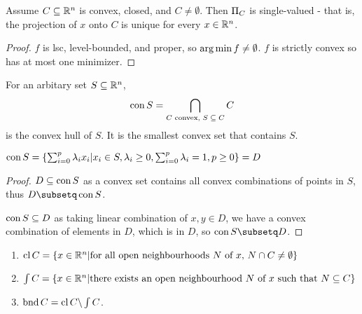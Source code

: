 \begin{thm}
  \label{sec:convexity-13}
  Assume $C \subseteq \mathbb{R}^{n}$ is convex, closed, and $C \neq
  \emptyset$.  Then $\operatorname*{\Pi}_{C}$ is single-valued - that is, the
  projection of $x$ onto $C$ is unique for every $x \in \mathbb{R}^{n}$.
\end{thm}

\begin{proof}
  $f$ is lsc, level-bounded, and proper, so $\operatorname*{arg\,min} f \neq
  \emptyset$.  $f$ is strictly convex so has at most one minimizer.
\end{proof}

\begin{defn}
  \label{sec:convexity-14}
  For an arbitary set $S \subseteq \mathbb{R}^{n}$,
  \begin{equation}
    \label{eq:10}
    \operatorname*{con} S = \bigcap_{\text{$C$ convex, $S \subseteq C$}} C
  \end{equation}
  is the convex hull of $S$.  It is the smallest convex set that
  contains $S$.
\end{defn}

\begin{thm}
  \label{sec:convexity-15}
  $\operatorname*{con} S = \{ \sum_{i=0}^{p} \lambda_{i} x_{i} | x_{i} \in S,
  \lambda_{i} \geq 0, \sum_{i=0}^{p} \lambda_{i} = 1, p \geq 0  \} = D$
\end{thm}

\begin{proof}
  $D \subseteq \operatorname*{con} S$ as a convex set contains all convex
  combinations of points in $S$, thus $D \subsetq \con S$.

  $\operatorname*{con} S \subseteq D$ as taking linear combination of $x, y \in D$,
  we have a convex combination of elements in $D$, which is in $D$, so
  $\con S \subsetq D$.

\end{proof}

\begin{thm}
  \label{sec:convexity-16}
  \begin{enumerate}
  \item $\operatorname*{cl} C = \{ x \in \mathbb{R}^{n} | \text{for all open neighbourhoods
      $N$ of $x$, $N \cap C \neq \emptyset$} \}$
  \item $\int C = \{ x \in \mathbb{R}^{n} | \text{there exists an open
      neighbourhood $N$ of $x$ such that $N \subseteq C$} \} $
  \item $\operatorname*{bnd} C = \operatorname*{cl} C \backslash \int C$.
  \end{enumerate}
\end{thm}

